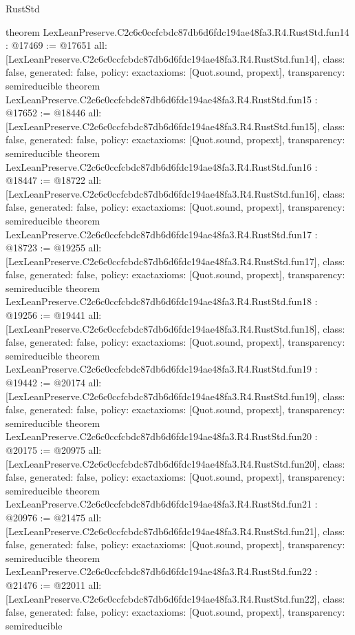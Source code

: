 \begin{lexlean}{RustStd}
\begin{coremodule}
{}
theorem LexLeanPreserve.C2c6c0ccfcbdc87db6d6fdc194ae48fa3.R4.RustStd.fun14 : @17469 := @17651 {
  all: [LexLeanPreserve.C2c6c0ccfcbdc87db6d6fdc194ae48fa3.R4.RustStd.fun14],
  class: false,
  generated: false,
  policy: exact{axioms: [Quot.sound, propext]},
  transparency: semireducible
}
theorem LexLeanPreserve.C2c6c0ccfcbdc87db6d6fdc194ae48fa3.R4.RustStd.fun15 : @17652 := @18446 {
  all: [LexLeanPreserve.C2c6c0ccfcbdc87db6d6fdc194ae48fa3.R4.RustStd.fun15],
  class: false,
  generated: false,
  policy: exact{axioms: [Quot.sound, propext]},
  transparency: semireducible
}
theorem LexLeanPreserve.C2c6c0ccfcbdc87db6d6fdc194ae48fa3.R4.RustStd.fun16 : @18447 := @18722 {
  all: [LexLeanPreserve.C2c6c0ccfcbdc87db6d6fdc194ae48fa3.R4.RustStd.fun16],
  class: false,
  generated: false,
  policy: exact{axioms: [Quot.sound, propext]},
  transparency: semireducible
}
theorem LexLeanPreserve.C2c6c0ccfcbdc87db6d6fdc194ae48fa3.R4.RustStd.fun17 : @18723 := @19255 {
  all: [LexLeanPreserve.C2c6c0ccfcbdc87db6d6fdc194ae48fa3.R4.RustStd.fun17],
  class: false,
  generated: false,
  policy: exact{axioms: [Quot.sound, propext]},
  transparency: semireducible
}
theorem LexLeanPreserve.C2c6c0ccfcbdc87db6d6fdc194ae48fa3.R4.RustStd.fun18 : @19256 := @19441 {
  all: [LexLeanPreserve.C2c6c0ccfcbdc87db6d6fdc194ae48fa3.R4.RustStd.fun18],
  class: false,
  generated: false,
  policy: exact{axioms: [Quot.sound, propext]},
  transparency: semireducible
}
theorem LexLeanPreserve.C2c6c0ccfcbdc87db6d6fdc194ae48fa3.R4.RustStd.fun19 : @19442 := @20174 {
  all: [LexLeanPreserve.C2c6c0ccfcbdc87db6d6fdc194ae48fa3.R4.RustStd.fun19],
  class: false,
  generated: false,
  policy: exact{axioms: [Quot.sound, propext]},
  transparency: semireducible
}
theorem LexLeanPreserve.C2c6c0ccfcbdc87db6d6fdc194ae48fa3.R4.RustStd.fun20 : @20175 := @20975 {
  all: [LexLeanPreserve.C2c6c0ccfcbdc87db6d6fdc194ae48fa3.R4.RustStd.fun20],
  class: false,
  generated: false,
  policy: exact{axioms: [Quot.sound, propext]},
  transparency: semireducible
}
theorem LexLeanPreserve.C2c6c0ccfcbdc87db6d6fdc194ae48fa3.R4.RustStd.fun21 : @20976 := @21475 {
  all: [LexLeanPreserve.C2c6c0ccfcbdc87db6d6fdc194ae48fa3.R4.RustStd.fun21],
  class: false,
  generated: false,
  policy: exact{axioms: [Quot.sound, propext]},
  transparency: semireducible
}
theorem LexLeanPreserve.C2c6c0ccfcbdc87db6d6fdc194ae48fa3.R4.RustStd.fun22 : @21476 := @22011 {
  all: [LexLeanPreserve.C2c6c0ccfcbdc87db6d6fdc194ae48fa3.R4.RustStd.fun22],
  class: false,
  generated: false,
  policy: exact{axioms: [Quot.sound, propext]},
  transparency: semireducible
}
\end{coremodule}
\end{lexlean}
